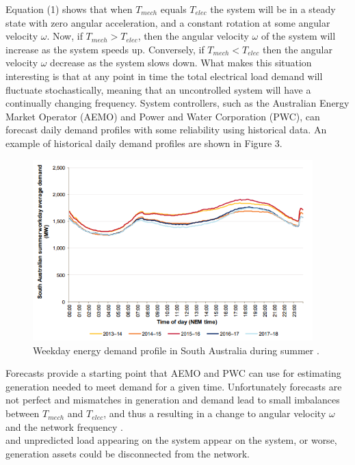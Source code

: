 \documentclass[12pt, a4paper]{article}
\begin{document}
Equation (1) shows that when $T_{mech}$ equals $T_{elec}$ the system will be in a steady state with zero angular acceleration, and a constant rotation at some angular velocity $\omega$. Now, if $T_{mech} > T_{elec}$, then the angular velocity $\omega$ of the system will increase as the system speeds up. Conversely, if $T_{mech} < T_{elec}$ then the angular velocity $\omega$ decrease as the system slows down. What makes this situation interesting is that at any point in time the total electrical load demand will fluctuate stochastically, meaning that an uncontrolled system will have a continually changing frequency. System controllers, such as the Australian Energy Market Operator (AEMO) and Power and Water Corporation (PWC), can forecast daily demand profiles with some reliability using historical data. An example of historical daily demand profiles are shown in Figure 3.  
\begin{figure}[h]
	\centering
	\includegraphics[height=7cm]{load_profile}
	\caption{Weekday energy demand profile in South Australia during summer \cite{AEMO2018}.}
\end{figure}

Forecasts provide a starting point that AEMO and PWC can use for estimating generation needed to meet demand for a given time. Unfortunately forecasts are not perfect and mismatches in generation and demand lead to small imbalances between $T_{mech}$ and $T_{elec}$, and thus a resulting in a change to angular velocity $\omega$ and the network frequency \cite{Glover2012}.\\ and unpredicted load appearing on the system appear on the system, or worse, generation assets could be disconnected from the network. 
\end{document}

